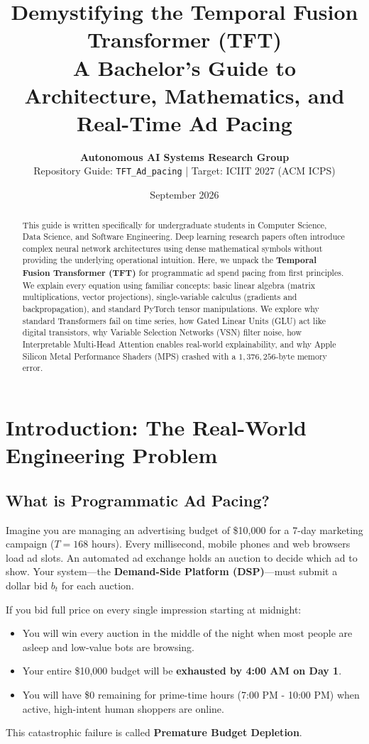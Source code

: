\documentclass[11pt,a4paper]{article}
\title{\LARGE \textbf{Demystifying the Temporal Fusion Transformer (TFT)}\\
\Large \textbf{A Bachelor's Guide to Architecture, Mathematics, and Real-Time Ad Pacing}}
\author{\textbf{Autonomous AI Systems Research Group} \\
Repository Guide: \texttt{TFT\_Ad\_pacing} \quad | \quad Target: ICIIT 2027 (ACM ICPS)}
\date{September 2026}
\begin{document}
\maketitle

\begin{abstract}
This guide is written specifically for undergraduate students in Computer Science, Data Science, and Software Engineering. Deep learning research papers often introduce complex neural network architectures using dense mathematical symbols without providing the underlying operational intuition. Here, we unpack the \textbf{Temporal Fusion Transformer (TFT)} for programmatic ad spend pacing from first principles. We explain every equation using familiar concepts: basic linear algebra (matrix multiplications, vector projections), single-variable calculus (gradients and backpropagation), and standard PyTorch tensor manipulations. We explore why standard Transformers fail on time series, how Gated Linear Units (GLU) act like digital transistors, why Variable Selection Networks (VSN) filter noise, how Interpretable Multi-Head Attention enables real-world explainability, and why Apple Silicon Metal Performance Shaders (MPS) crashed with a $1,376,256$-byte memory error.
\end{abstract}

\tableofcontents
\newpage

\section{Introduction: The Real-World Engineering Problem}

\subsection{What is Programmatic Ad Pacing?}
Imagine you are managing an advertising budget of \$10,000 for a 7-day marketing campaign ($T = 168\text{ hours}$). Every millisecond, mobile phones and web browsers load ad slots. An automated ad exchange holds an auction to decide which ad to show. Your system—the \textbf{Demand-Side Platform (DSP)}—must submit a dollar bid $b_t$ for each auction.

\begin{intuitionbox}
If you bid full price on every single impression starting at midnight:
\begin{itemize}
    \item You will win every auction in the middle of the night when most people are asleep and low-value bots are browsing.
    \item Your entire \$10,000 budget will be \textbf{exhausted by 4:00 AM on Day 1}.
    \item You will have \$0 remaining for prime-time hours (7:00 PM - 10:00 PM) when active, high-intent human shoppers are online.
\end{itemize}
This catastrophic failure is called \textbf{Premature Budget Depletion}.
\end{intuitionbox}
\end{document}
